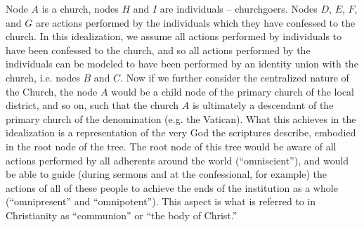 \documentclass[pra,twocolumn,groupedaddress,10pt]{revtex4}
\theoremstyle{definition}
\begin{document}
Node $A$ is a church, nodes $H$ and $I$ are individuals -- churchgoers. Nodes $D$, $E$, $F$, and $G$ are actions performed by the individuals which they have confessed to the church. In this idealization, we assume all actions performed by individuals to have been confessed to the church, and so all actions performed by the individuals can be modeled to have been performed by an identity union with the church, i.e. nodes $B$ and $C$. Now if we further consider the centralized nature of the Church, the node $A$ would be a child node of the primary church of the local district, and so on, such that the church $A$ is ultimately a descendant of the primary church of the denomination (e.g. the Vatican). What this achieves in the idealization is a representation of the very God the scriptures describe, embodied in the root node of the tree. The root node of this tree would be aware of all actions performed by all adherents around the world (``omniscient''), and would be able to guide (during sermons and at the confessional, for example) the actions of all of these people to achieve the ends of the institution as a whole (``omnipresent'' and ``omnipotent''). This aspect is what is referred to in Christianity as ``communion'' or ``the body of Christ.''\cite{biblebodyofchrist}
\end{document}
